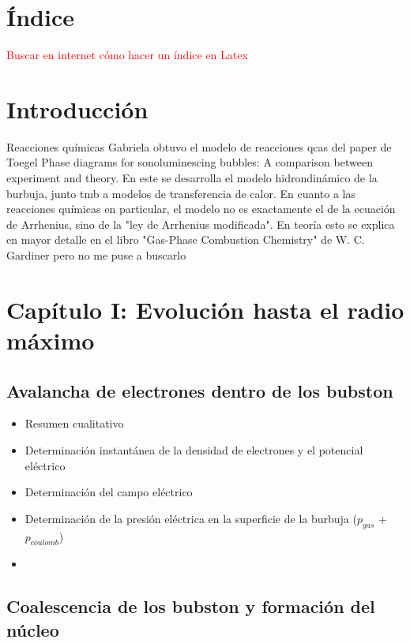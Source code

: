 \documentclass[aps,prb,twocolumn,superscriptaddress,floatfix,longbibliography,10pt]{revtex4-2}
\newif\ifptitle
\newif\ifpnumber
\newcounter{para}
\newcommand\ptitle[1]{\par\refstepcounter{para}
{\ifpnumber{\noindent\textcolor{lightgray}{\textbf{\thepara}}\indent}\fi}
{\ifptitle{\textbf{[{#1}]}}\fi}}
\begin{document}
\section*{Índice}
\textcolor{red}{Buscar en internet cómo hacer un índice en Latex}

\section*{Introducción}

Reacciones químicas
Gabriela obtuvo el modelo de reacciones qcas del paper de Toegel Phase diagrams for sonoluminescing bubbles: A comparison between experiment and theory. En este se desarrolla el modelo hidrondinámico de la burbuja, junto tmb a modelos de transferencia de calor. En cuanto a las reacciones químicas en particular, el modelo no es exactamente el de la ecuación de Arrhenius, sino de la "ley de Arrhenius modificada". En teoría esto se explica en mayor detalle en el libro "Gas-Phase Combustion Chemistry" de W. C. Gardiner pero no me puse a buscarlo


\section*{Capítulo I: Evolución hasta el radio máximo}

\ptitle{Resumen del capítulo}

\subsection{}

\subsection{Avalancha de electrones dentro de los bubston}

\begin{itemize}
  \item Resumen cualitativo
  \item Determinación instantánea de la densidad de electrones y el potencial eléctrico
  \item Determinación del campo eléctrico
  \item Determinación de la presión eléctrica en la superficie de la burbuja ($p_{gas}$ + $p_{coulomb}$)
  \item 
\end{itemize}



\subsection{Coalescencia de los bubston y formación del núcleo}
\end{document}
